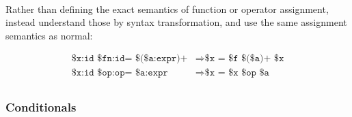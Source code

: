 \begin{bnf*}
     \\
     \\
     \\
     \\
     \\
     \\
    \bnfmore{
        \bnfts{|=}\bnfor
        \bnfts{\&=}\bnfor
        \bnfts{\textasciicircum=}\bnfor
        \bnfts{\textasciitilde=}\bnfor
        \bnfts{<\textasciitilde=}\bnfor
        \bnfts{\textasciitilde>=}
    }
\end{bnf*}

\begin{prooftree}
\end{prooftree}

Rather than defining the exact semantics of function or operator assignment,
instead understand those by syntax transformation, and use the same assignment
semantics as normal:

\begin{align*}
    \texttt{\$x:id \$fn:id= \$(\$a:expr)+} &\Rightarrow \texttt{\$x = \$f \$(\$a)+ \$x} \\ %
    \texttt{\$x:id \$op:op= \$a:expr} & \Rightarrow \texttt{\$x = \$x \$op \$a} \\ %
\end{align*}

\subsubsection{Conditionals}

